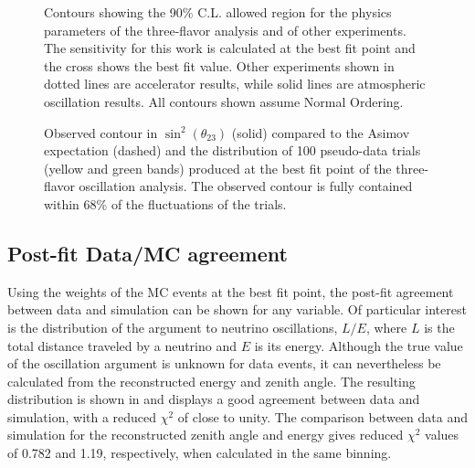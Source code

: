 \begin{figure}
    \centering
  
  \caption{Contours showing the 90\% C.L.
allowed region for the physics parameters of the three-flavor analysis and of other experiments\cite{SK2020,t2k_neutrino_2020,MINOS:2020llm,NOvA:2021nfi}.
The sensitivity for this work is calculated at the best fit point and the cross shows the best fit value.
Other experiments shown in dotted lines are accelerator results, while solid lines are atmospheric oscillation results.
All contours shown assume Normal Ordering.
  \label{fig:real_data_contour_three_flavor}}
\end{figure}

\begin{figure}
    \centering
    
    \caption{Observed contour in $\sin^2(\theta_{23})$ (solid) compared to the Asimov expectation (dashed) and the distribution of 100 pseudo-data trials (yellow and green bands) produced at the best fit point of the three-flavor oscillation analysis.
The observed contour is fully contained within 68\% of the fluctuations of the trials.
  \label{fig:mixing_brazil_band_three_flavor}}
\end{figure}

\subsection{Post-fit Data/MC agreement}

Using the weights of the MC events at the best fit point, the post-fit agreement between data and simulation can be shown for any variable.
Of particular interest is the distribution of the argument to neutrino oscillations, $L/E$, where $L$ is the total distance traveled by a neutrino and $E$ is its energy.
Although the true value of the oscillation argument is unknown for data events, it can nevertheless be calculated from the reconstructed energy and zenith angle.
The resulting distribution is shown in  and displays a good agreement between data and simulation, with a reduced $\chi^2$ of close to unity.
The comparison between data and simulation for the reconstructed zenith angle and energy gives reduced $\chi^2$ values of 0.782 and 1.19, respectively, when calculated in the same binning.

